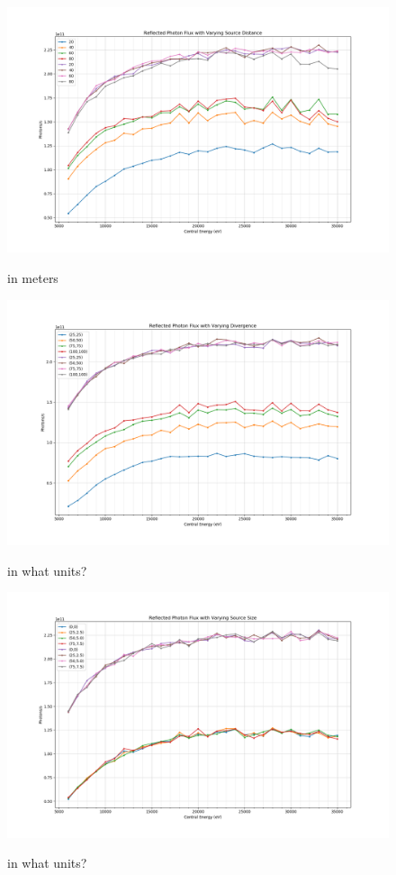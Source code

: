 \documentclass[preprint]{iucr}              %
\begin{document}
\begin{figure}
\caption{in meters}
\includegraphics{images/333straindistance.png}
\label{fig:333straindistance}
\end{figure}

\begin{figure}
\caption{in what units?}
\includegraphics{images/333straindivergence.png}
\label{fig:333straindivergence}
\end{figure}

\begin{figure}
\caption{in what units?}
\includegraphics{images/333strainsize.png}
\label{fig:333strainsourcesize}
\end{figure}
\end{document}
